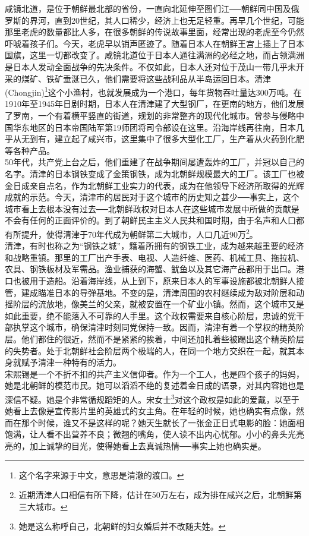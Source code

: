 咸镜北道，是位于朝鲜最北部的省份，一直向北延伸至图们江──朝鲜同中国及俄罗斯的界河，直到20世纪，其人口稀少，经济上也无足轻重。再早几个世纪，可能那里老虎的数量都比人多，在很多朝鲜的传说故事里面，经常出现的老虎至今仍然吓唬着孩子们。今天，老虎早以销声匿迹了。随着日本人在朝鲜王宫上插上了日本国旗，这里一切都改变了。咸镜北道位于日本人通往满洲的必经之地，而占领满洲是日本人发动全面战争的先决条件。不仅如此，日本人还对位于茂山一带几乎未开采的煤矿、铁矿垂涎已久，他们需要将这些战利品从半岛运回日本。清津(Chongjin)\footnote{这个名字来源于中文，意思是清澈的渡口。}这个小渔村，也就发展成为一个港口，每年货物吞吐量达300万吨。在1910年至1945年日剧时期，日本人在清津建了大型钢厂，在更南的地方，他们发展了罗南，一个有着横平竖直的街道，规划的非常整齐的现代化城市。曾参与侵略中国华东地区的日本帝国陆军第19师团将司令部设在这里。沿海岸线再往南，日本几乎从无到有，建立起了咸兴市，这里集中了很多大型化工厂，生产着从火药到化肥等各种产品。\\

50年代，共产党上台之后，他们重建了在战争期间屡遭轰炸的工厂，并冠以自己的名字。清津的日本钢铁变成了金策钢铁，成为北朝鲜规模最大的工厂。该工厂也被金日成亲自点名，作为北朝鲜工业实力的代表，成为在他领导下经济所取得的光辉成就的示范。今天，清津市的居民对于这个城市的历史知之甚少──事实上，这个城市看上去根本没有过去──北朝鲜政权对日本人在这些城市发展中所做的贡献是不会有任何的正面评价的。到了朝鲜民主主义人民共和国时期，由于名声和人口都有所提升，使得清津于70年代成为朝鲜第二大城市，人口几近90万\footnote{近期清津人口相信有所下降，估计在50万左右，成为排在咸兴之后，北朝鲜第三大城市。}。\\

清津，有时也称之为“钢铁之城”，籍着所拥有的钢铁工业，成为越来越重要的经济和战略重镇。那里的工厂出产手表、电视、人造纤维、医药、机械工具、拖拉机、农具、钢铁板材及军需品。渔业捕获的海蟹、鱿鱼以及其它海产品都用于出口。港口也被用于造船。沿着海岸线，从上到下，原来日本人的军事设施都被北朝鲜人接管，建成瞄准日本的导弹基地。不变的是，清津周围的农村继续成为敌对阶层和动摇阶层的流放地，像美兰的父亲，就被安置在一个矿业小镇。然而，这个城市又是如此重要，绝不能落入不可靠的人手里。这个政权需要来自核心阶层，忠诚的党干部执掌这个城市，确保清津时刻同党保持一致。因而，清津有着一个掌权的精英阶层。他们都住的很近，然而不是紧紧的挨着，中间还加扎着些被踢出这个精英阶层的失势者。处于北朝鲜社会阶层两个极端的人，在同一个地方交织在一起，就其本身就赋予清津一种特有的活力。\\

宋熙锡是一个不折不扣的共产主义信仰者。作为一个工人，也是四个孩子的妈妈，她是北朝鲜的模范市民。她可以滔滔不绝的复述着金日成的语录，对其内容她也是深信不疑。她是个非常循规蹈矩的人。宋女士\footnote{她是这么称呼自己，北朝鲜的妇女婚后并不改随夫姓。}对这个政权是如此的爱戴，以至于她看上去像是宣传影片里的英雄式的女主角。在年轻的时候，她也确实有点像，然而在那个时候，谁又不是这样的呢？她天生就长了一张金正日式电影的脸：她面相饱满，让人看不出营养不良；微翘的嘴角，使人读不出内心忧郁。小小的鼻头光亮亮的，加上诚挚的目光，使得她看上去真诚热情──事实上她也确实是。\\

